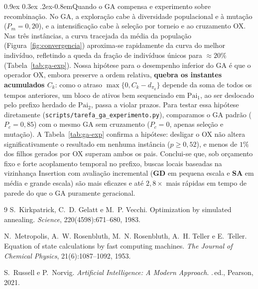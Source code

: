 \documentclass[10pt,a4paper,twocolumn]{article}
\makeatletter
\renewcommand\paragraph{\@startsection{paragraph}{4}{\z@}%
  {0.9ex \@plus 0.3ex \@minus .2ex}{-0.8em}{\normalfont\normalsize\bfseries}}
\makeatother
\begin{document}
\paragraph{Quando o GA compensa e experimento sobre recombinação.}
No GA, a exploração cabe à diversidade populacional e à mutação ($P_m=0{,}20$), e a
intensificação cabe à seleção por torneio e ao cruzamento OX. Nas três instâncias, a
curva tracejada da média da população (Figura~\ref{fig:convergencia}) aproxima-se
rapidamente da curva do melhor indivíduo, refletindo a queda da fração de indivíduos
únicos para $\approx 20\%$ (Tabela~\ref{tab:ga-exp}). Nossa hipótese para o desempenho
inferior do GA é que o operador OX, embora preserve a ordem relativa, \textbf{quebra os
instantes acumulados $C_k$}: como o atraso $\max\{0,C_k-d_{\pi_k}\}$ depende da soma de
todos os tempos anteriores, um bloco de ativos bem sequenciado em $\text{Pai}_1$, ao
ser deslocado pelo prefixo herdado de $\text{Pai}_2$, passa a violar prazos. Para
testar essa hipótese diretamente (\texttt{scripts/tarefa\_ga\_experimento.py}),
comparamos o GA padrão ($P_c=0{,}85$) com o mesmo GA sem cruzamento ($P_c=0$, apenas
seleção e mutação). A Tabela~\ref{tab:ga-exp} confirma a hipótese: desligar o OX não
altera significativamente o resultado em nenhuma instância ($p\ge 0{,}52$), e menos de
$1\%$ dos filhos gerados por OX superam ambos os pais. Conclui-se que, sob orçamento
fixo e forte acoplamento temporal no prefixo, buscas locais baseadas na vizinhança
Insertion com avaliação incremental (\textbf{GD} em pequena escala e \textbf{SA} em
média e grande escala) são mais eficazes e até $2{,}8\times$ mais rápidas em tempo de
parede do que o GA puramente geracional.

\begin{thebibliography}{9}\small
{}
S.~Kirkpatrick, C.~D. Gelatt e M.~P. Vecchi.
\newblock Optimization by simulated annealing.
\newblock \emph{Science}, 220(4598):671--680, 1983.

N.~Metropolis, A.~W. Rosenbluth, M.~N. Rosenbluth, A.~H. Teller e E.~Teller.
\newblock Equation of state calculations by fast computing machines.
\newblock \emph{The Journal of Chemical Physics}, 21(6):1087--1092, 1953.

S.~Russell e P.~Norvig.
\newblock \emph{Artificial Intelligence: A Modern Approach}.
.\,ed., Pearson, 2021.
\end{thebibliography}
\end{document}
